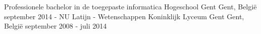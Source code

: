 


\begin{cventries}


\cventry
{Professionele bachelor in de toegepaste informatica} %
{Hogeschool Gent} %
{Gent, België} %
{september 2014 - NU} %
{ %
}
\cventry
{Latijn - Wetenschappen} %
{Koninklijk Lyceum Gent} %
{Gent, België} %
{september 2008 - juli 2014} %
{ %
}


\end{cventries}